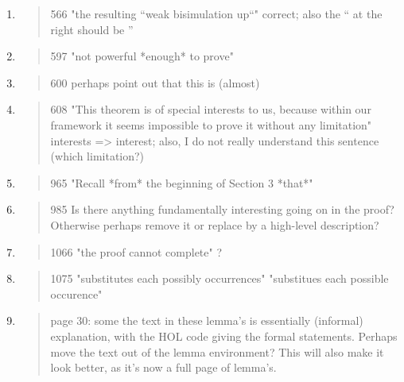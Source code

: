 \begin{enumerate}
  \item \begin{quote}
566 "the resulting ``weak bisimulation up``" correct; also the `` at the right should be ''
\end{quote}
  \Mark

  \item \begin{quote}
597 "not powerful *enough* to prove" 
\end{quote}
  \Mark

  \item \begin{quote}
600 perhaps point out that this is (almost) 
\end{quote}
  \Mark

  \item \begin{quote}
608 "This theorem is of special interests to us, because within our framework it seems impossible to prove it without any limitation" interests => interest; also, I do not really understand this sentence (which limitation?)
\end{quote}
  \Mark

  \item \begin{quote}
965 "Recall *from* the beginning of Section 3 *that*"
\end{quote}
  \Mark

  \item \begin{quote}
985 Is there anything fundamentally interesting going on in the proof? Otherwise perhaps remove it or replace by a high-level description?
\end{quote}
  \Mark

  \item \begin{quote}
1066 "the proof cannot complete" ?
\end{quote}
  \Mark

  \item \begin{quote}
1075 "substitutes each possibly occurrences" "substitues each possible occurence"
\end{quote}
  \Mark

  \item \begin{quote}
page 30: some the text in these lemma's is essentially (informal) explanation, with the HOL code giving the formal statements. Perhaps move the text out of the lemma environment? This will also make it look better, as it's now a full page of lemma's. 
\end{quote}
  \Mark


\end{enumerate}
